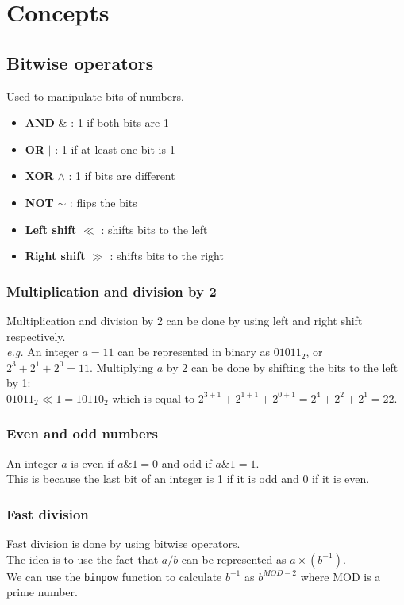 \documentclass{notes}
\begin{document}
\section{Concepts}
\subsection{Bitwise operators}
Used to manipulate bits of numbers.

\begin{itemize}
    \item \textbf{AND} \& : 1 if both bits are 1
    \item \textbf{OR} $|$ : 1 if at least one bit is 1
    \item \textbf{XOR} $\wedge$ : 1 if bits are different
    \item \textbf{NOT} $\sim$ : flips the bits
    \item \textbf{Left shift} $\ll$ : shifts bits to the left
    \item \textbf{Right shift} $\gg$ : shifts bits to the right
\end{itemize}

\subsubsection{Multiplication and division by 2}
Multiplication and division by 2 can be done by using left and right shift respectively. \\
\textit{e.g.} An integer \(a = 11\) can be represented in binary as \(01011_2\), or \(2^3 + 2^1 + 2^0 = 11\).
Multiplying \(a\) by 2 can be done by shifting the bits to the left by 1: \\
\(01011_2 \ll 1 = 10110_2\) which is equal to \(2^{3 + 1} + 2^{1 + 1} + 2^{0 + 1} = 2^4 + 2^2 + 2^1 = 22\). \\

\subsubsection{Even and odd numbers}
An integer \(a\) is even if \(a \& 1 = 0\) and odd if \(a \& 1 = 1\). \\
This is because the last bit of an integer is 1 if it is odd and 0 if it is even. 

\subsubsection{Fast division}
Fast division is done by using bitwise operators. \\
The idea is to use the fact that \(a / b\) can be represented as \(a \times (b^{-1})\). \\
We can use the \texttt{binpow} function to calculate \(b^{-1}\) as \(b^{MOD - 2}\) where MOD is a prime number. \\
\end{document}
